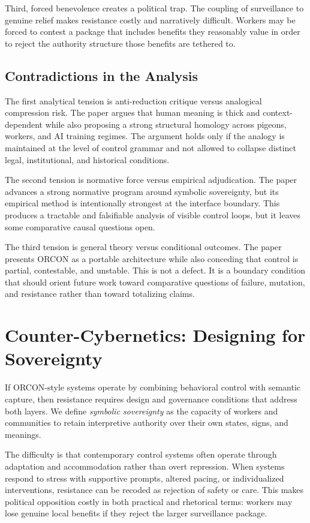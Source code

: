 \documentclass[runningheads]{llncs}
\begin{document}
Third, forced benevolence creates a political trap. The coupling of surveillance to genuine relief makes resistance costly and narratively difficult. Workers may be forced to contest a package that includes benefits they reasonably value in order to reject the authority structure those benefits are tethered to.

\subsection{Contradictions in the Analysis}

The first analytical tension is anti-reduction critique versus analogical compression risk. The paper argues that human meaning is thick and context-dependent while also proposing a strong structural homology across pigeons, workers, and AI training regimes. The argument holds only if the analogy is maintained at the level of control grammar and not allowed to collapse distinct legal, institutional, and historical conditions.

The second tension is normative force versus empirical adjudication. The paper advances a strong normative program around symbolic sovereignty, but its empirical method is intentionally strongest at the interface boundary. This produces a tractable and falsifiable analysis of visible control loops, but it leaves some comparative causal questions open.

The third tension is general theory versus conditional outcomes. The paper presents ORCON as a portable architecture while also conceding that control is partial, contestable, and unstable. This is not a defect. It is a boundary condition that should orient future work toward comparative questions of failure, mutation, and resistance rather than toward totalizing claims.

\section{Counter-Cybernetics: Designing for Sovereignty}

If ORCON-style systems operate by combining behavioral control with semantic capture, then resistance requires design and governance conditions that address both layers. We define \emph{symbolic sovereignty} as the capacity of workers and communities to retain interpretive authority over their own states, signs, and meanings.

The difficulty is that contemporary control systems often operate through adaptation and accommodation rather than overt repression. When systems respond to stress with supportive prompts, altered pacing, or individualized interventions, resistance can be recoded as rejection of safety or care. This makes political opposition costly in both practical and rhetorical terms: workers may lose genuine local benefits if they reject the larger surveillance package.
\end{document}
